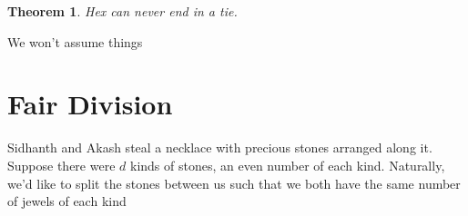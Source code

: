 \documentclass[12pt]{amsart}
\newtheorem{theorem}{Theorem}
\begin{document}
    \begin{theorem}
        Hex can never end in a tie.
    \end{theorem}

    We won't assume things



    \newpage

    \section{Fair Division}

    Sidhanth and Akash steal a necklace with precious stones arranged along it. Suppose there were $d$ kinds of stones, an even number of each kind. Naturally, we'd like to split the stones between us such that we both have the same number of jewels of each kind


    \newpage


    
\end{document}
